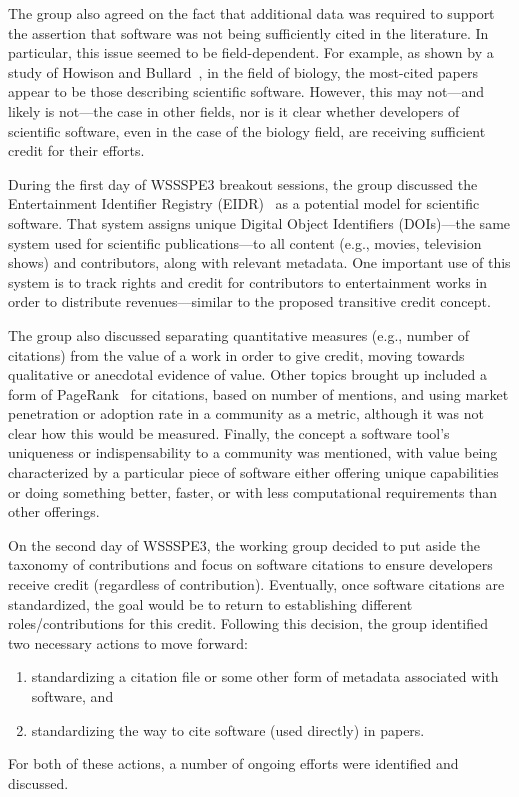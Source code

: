The group also agreed on the fact that additional data was required to support
the assertion that software was not being sufficiently cited in the literature.
In particular, this issue seemed to be field-dependent. For example, as shown by
a study of Howison and Bullard~\cite{Howison2015}, in the field of biology, the
most-cited papers appear to be those describing scientific software. However,
this may not---and likely is not---the case in other fields, nor is it clear
whether developers of scientific software, even in the case of the biology
field, are receiving sufficient credit for their efforts.

During the first day of WSSSPE3 breakout sessions, the group discussed the
Entertainment Identifier Registry (EIDR)~\cite{EIDR} as a potential model for
scientific software. That system assigns unique Digital Object Identifiers
(DOIs)---the same system used for scientific publications---to all content
(e.g., movies, television shows) and contributors, along with relevant metadata.
One important use of this system is to track rights and credit for contributors
to entertainment works in order to distribute revenues---similar to the proposed
transitive credit concept.

The group also discussed separating quantitative measures (e.g., number of
citations) from the value of a work in order to give credit, moving towards
qualitative or anecdotal evidence of value. Other topics brought up included a
form of PageRank~\cite{Brin1998} for citations, based on number of mentions, and
using market penetration or adoption rate in a community as a metric, although
it was not clear how this would be measured. Finally, the concept a software
tool's uniqueness or indispensability to a community was mentioned, with value
being characterized by a particular piece of software either offering unique
capabilities or doing something better, faster, or with less computational
requirements than other offerings.

On the second day of WSSSPE3, the working group decided to put aside the
taxonomy of contributions and focus on software citations to ensure developers
receive credit (regardless of contribution). Eventually, once 
software citations are standardized, the goal would be to return to establishing different
roles\slash contributions for this credit. Following this decision, the group
identified two necessary actions to move forward:
\begin{enumerate}

\item standardizing a citation file or some other form of metadata associated
with software, and

\item standardizing the way to cite software (used directly) in papers.
        
\end{enumerate}
For both of these actions, a number of ongoing efforts were identified and discussed.

